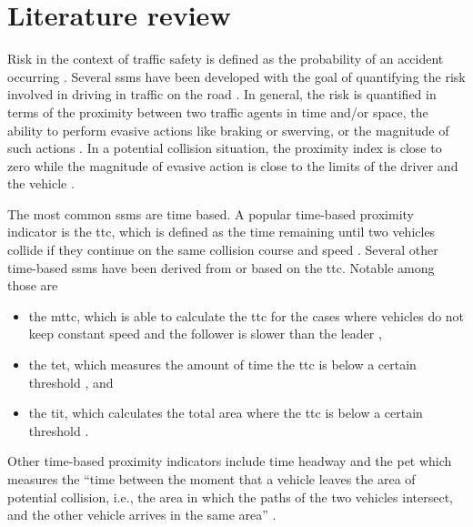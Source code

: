 \section{Literature review}
\label{sec:literature review}

Risk in the context of traffic safety is defined as the probability of an accident occurring \autocite{hakkert2002uses}.
Several \acp{ssm} have been developed with the goal of quantifying the risk involved in driving in traffic on the road \autocite{minderhoud2001extended, ozbay2008derivation, cunto2009simulated, laureshyn2010evaluation}.
In general, the risk is quantified in terms of the proximity between two traffic agents in time and/or space, the ability to perform evasive actions like braking or swerving, or the magnitude of such actions \autocite{shi2018key,zheng2020modeling}. 
In a potential collision situation, the proximity index is close to zero while the magnitude of evasive action is close to the limits of the driver and the vehicle \autocite{zheng2020modeling}. 

The most common \acp{ssm} are time based. 
A popular time-based proximity indicator is the \ac{ttc}, which is defined as the time remaining until two vehicles collide if they continue on the same collision course and speed \autocite{hayward1972near}. 
Several other time-based \acp{ssm} have been derived from or based on the \ac{ttc}. 
Notable among those are 
\begin{itemize}
    \item the \ac{mttc}, which is able to calculate the \ac{ttc} for the cases where vehicles do not keep constant speed and the follower is slower than the leader \autocite{ozbay2008derivation},
    \item the \ac{tet}, which measures the amount of time the \ac{ttc} is below a certain threshold \autocite{minderhoud2001extended}, and
    \item the \ac{tit}, which calculates the total area where the \ac{ttc} is below a certain threshold  \autocite{minderhoud2001extended}. 
\end{itemize}
Other time-based proximity indicators include time headway and the \ac{pet} which measures the ``time between the moment that a vehicle leaves the area of potential collision, i.e., the area in which the paths of the two vehicles intersect, and the other vehicle arrives in the same area'' \autocite{mahmud2017application}. 

